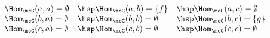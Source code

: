
\begin{align*}
\begin{array}{lll}
\Hom_\mcG(a,a)=\emptyset&\hsp\Hom_\mcG(a,b)=\{f\}&\hsp\Hom_\mcG(a,c)=\emptyset\\
\Hom_\mcG(b,a)=\emptyset&\hsp\Hom_\mcG(b,b)=\emptyset&\hsp\Hom_\mcG(b,c)=\{g\}\\
\Hom_\mcG(c,a)=\emptyset&\hsp\Hom_\mcG(c,b)=\emptyset&\hsp\Hom_\mcG(c,c)=\emptyset
\end{array}
\end{align*}
